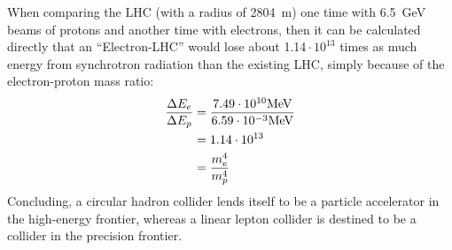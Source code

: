 When comparing the LHC (with a radius of \SI{2804}{\meter}) one time with \SI{6.5}{\GeV} beams of protons and another time with electrons, then it can be calculated directly that an ``Electron-LHC'' would lose about 1.14\,$\cdot\,10^{13}$ times as much energy from synchrotron radiation than the existing LHC, simply because of the electron-proton mass ratio:
\begin{align*}
 \frac{\Delta E_e}{\Delta E_p} &= \frac{7.49\cdot10^{10} \textnormal{MeV}}{6.59\cdot10^{-3} \textnormal{MeV}}\\
 &=1.14\cdot10^{13}\\
 &=\frac{m_e^4}{m_p^4}
\end{align*}
Concluding, a circular hadron collider lends itself to be a particle accelerator in the high-energy frontier, whereas a linear lepton collider is destined to be a collider in the precision frontier.